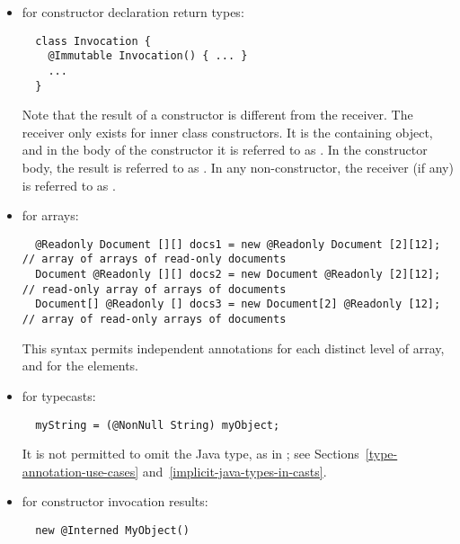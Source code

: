 \documentclass[10pt]{article}
\begin{document}
\begin{itemize}
\item for constructor declaration return types:

\preverbnegspace
\begin{Verbatim}
  class Invocation {
    @Immutable Invocation() { ... }
    ...
  }
\end{Verbatim}
\preverbnegspace

Note that the result of a constructor is different from the receiver.  The
receiver only exists for inner class constructors.  It is the containing
object, and in the body of the constructor it is referred to as
.  In the constructor body, the result is referred to as
.  In any non-constructor, the receiver (if any) is referred to
as .


\item for arrays:
\preverbnegspace
\begin{Verbatim}
  @Readonly Document [][] docs1 = new @Readonly Document [2][12]; // array of arrays of read-only documents
  Document @Readonly [][] docs2 = new Document @Readonly [2][12]; // read-only array of arrays of documents
  Document[] @Readonly [] docs3 = new Document[2] @Readonly [12]; // array of read-only arrays of documents
\end{Verbatim}

\preverbnegspace
This syntax permits independent annotations for each distinct level of
array, and for the elements.


\item for typecasts:
\preverbnegspace
\begin{Verbatim}
  myString = (@NonNull String) myObject;
\end{Verbatim}
\preverbnegspace
It is not permitted to omit the Java type, as in
; see
Sections~\ref{type-annotation-use-cases} and~\ref{implicit-java-types-in-casts}.

\item for constructor invocation results:

\preverbnegspace
\begin{Verbatim}
  new @Interned MyObject()
\end{Verbatim}
\preverbnegspace


\end{itemize}
\end{document}
